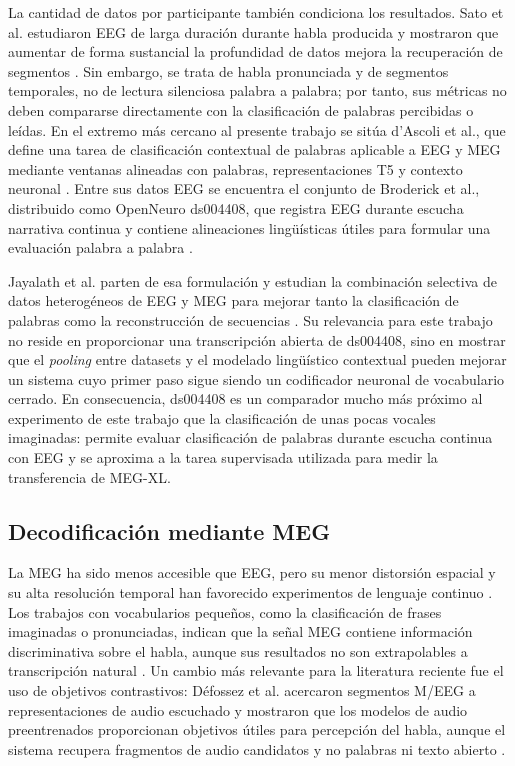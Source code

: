 La cantidad de datos por participante también condiciona los resultados. Sato et al. estudiaron EEG de larga duración durante habla producida y mostraron que aumentar de forma sustancial la profundidad de datos mejora la recuperación de segmentos \cite{sato2024scaling}. Sin embargo, se trata de habla pronunciada y de segmentos temporales, no de lectura silenciosa palabra a palabra; por tanto, sus métricas no deben compararse directamente con la clasificación de palabras percibidas o leídas. En el extremo más cercano al presente trabajo se sitúa d'Ascoli et al., que define una tarea de clasificación contextual de palabras aplicable a EEG y MEG mediante ventanas alineadas con palabras, representaciones T5 y contexto neuronal \cite{dascoli2025words}. Entre sus datos EEG se encuentra el conjunto de Broderick et al., distribuido como OpenNeuro ds004408, que registra EEG durante escucha narrativa continua y contiene alineaciones lingüísticas útiles para formular una evaluación palabra a palabra \cite{broderick2018semantic}.

Jayalath et al. parten de esa formulación y estudian la combinación selectiva de datos heterogéneos de EEG y MEG para mejorar tanto la clasificación de palabras como la reconstrucción de secuencias \cite{jayalath2025unlocking}. Su relevancia para este trabajo no reside en proporcionar una transcripción abierta de ds004408, sino en mostrar que el \textit{pooling} entre datasets y el modelado lingüístico contextual pueden mejorar un sistema cuyo primer paso sigue siendo un codificador neuronal de vocabulario cerrado. En consecuencia, ds004408 es un comparador mucho más próximo al experimento de este trabajo que la clasificación de unas pocas vocales imaginadas: permite evaluar clasificación de palabras durante escucha continua con EEG y se aproxima a la tarea supervisada utilizada para medir la transferencia de MEG-XL.

\subsection{Decodificación mediante MEG}

La MEG ha sido menos accesible que EEG, pero su menor distorsión espacial y su alta resolución temporal han favorecido experimentos de lenguaje continuo \cite{hamalainen1993meg,gross2013meg}. Los trabajos con vocabularios pequeños, como la clasificación de frases imaginadas o pronunciadas, indican que la señal MEG contiene información discriminativa sobre el habla, aunque sus resultados no son extrapolables a transcripción natural \cite{dash2020megphrases}. Un cambio más relevante para la literatura reciente fue el uso de objetivos contrastivos: Défossez et al. acercaron segmentos M/EEG a representaciones de audio escuchado y mostraron que los modelos de audio preentrenados proporcionan objetivos útiles para percepción del habla, aunque el sistema recupera fragmentos de audio candidatos y no palabras ni texto abierto \cite{defossez2023speech}.

